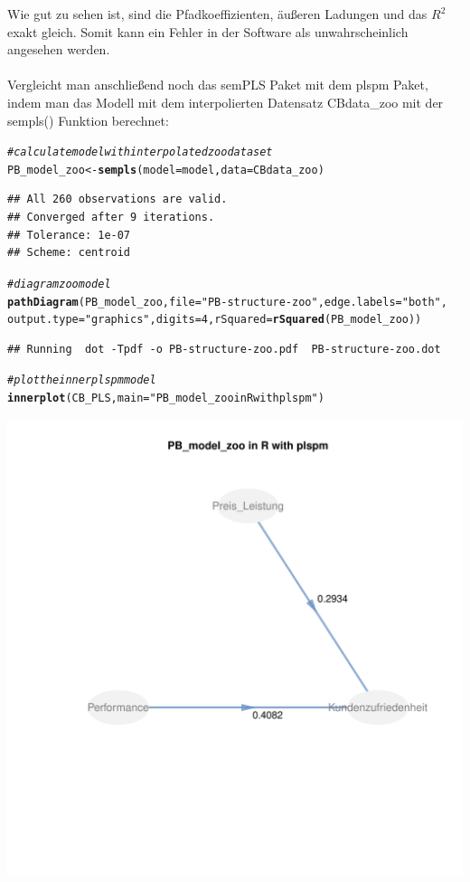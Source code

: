 \documentclass{article}\usepackage[]{graphicx}\usepackage[]{color}
\makeatletter
\def\maxwidth{ %
  \ifdim\Gin@nat@width>\linewidth
    \linewidth
  \else
    \Gin@nat@width
  \fi
}
\newcommand{\hlnum}[1]{\textcolor[rgb]{0.686,0.059,0.569}{#1}}%
\newcommand{\hlstr}[1]{\textcolor[rgb]{0.192,0.494,0.8}{#1}}%
\newcommand{\hlcom}[1]{\textcolor[rgb]{0.678,0.584,0.686}{\textit{#1}}}%
\newcommand{\hlstd}[1]{\textcolor[rgb]{0.345,0.345,0.345}{#1}}%
\newcommand{\hlkwb}[1]{\textcolor[rgb]{0.69,0.353,0.396}{#1}}%
\newcommand{\hlkwc}[1]{\textcolor[rgb]{0.333,0.667,0.333}{#1}}%
\newcommand{\hlkwd}[1]{\textcolor[rgb]{0.737,0.353,0.396}{\textbf{#1}}}%
\newenvironment{kframe}{%
 \def\at@end@of@kframe{}%
 \ifinner\ifhmode%
  \def\at@end@of@kframe{\end{minipage}}%
  \begin{minipage}{\columnwidth}%
 \fi\fi%
 \def\FrameCommand##1{\hskip\@totalleftmargin \hskip-\fboxsep
 \colorbox{shadecolor}{##1}\hskip-\fboxsep
     \hskip-\linewidth \hskip-\@totalleftmargin \hskip\columnwidth}%
 \MakeFramed {\advance\hsize-\width
   \@totalleftmargin\z@ \linewidth\hsize
   \@setminipage}}%
 {\par\unskip\endMakeFramed%
 \at@end@of@kframe}
\newenvironment{knitrout}{}{} %
\makeatother
\begin{document}
Wie gut zu sehen ist, sind die Pfadkoeffizienten, äußeren Ladungen und das $R^{2}$ exakt gleich. Somit kann ein Fehler in der Software als unwahrscheinlich angesehen werden.\\
\\
Vergleicht man anschließend noch das semPLS Paket mit dem plspm Paket, indem man das Modell mit dem interpolierten Datensatz CBdata\_zoo mit der sempls() Funktion berechnet:
\begin{knitrout}
\color{fgcolor}\begin{kframe}
\begin{alltt}
\hlcom{#calculate model with interpolated zoo dataset}
\hlstd{PB_model_zoo} \hlkwb{<-} \hlkwd{sempls}\hlstd{(}\hlkwc{model} \hlstd{= model,}\hlkwc{data} \hlstd{= CBdata_zoo)}
\end{alltt}
\begin{verbatim}
## All 260 observations are valid.
## Converged after 9 iterations.
## Tolerance: 1e-07
## Scheme: centroid
\end{verbatim}
\begin{alltt}
\hlcom{#diagram zoo model}
\hlkwd{pathDiagram}\hlstd{(PB_model_zoo,} \hlkwc{file} \hlstd{=} \hlstr{"PB-structure-zoo"}\hlstd{,} \hlkwc{edge.labels} \hlstd{=} \hlstr{"both"}\hlstd{,}
           \hlkwc{output.type} \hlstd{=} \hlstr{"graphics"}\hlstd{,} \hlkwc{digits} \hlstd{=} \hlnum{4}\hlstd{,} \hlkwc{rSquared}\hlstd{=}\hlkwd{rSquared}\hlstd{(PB_model_zoo))}
\end{alltt}
\begin{verbatim}
## Running  dot -Tpdf -o PB-structure-zoo.pdf  PB-structure-zoo.dot
\end{verbatim}
\begin{alltt}
\hlcom{#plot the inner plspm model}
\hlkwd{innerplot}\hlstd{(CB_PLS,} \hlkwc{main} \hlstd{=}\hlstr{"PB_model_zoo in R with plspm"}\hlstd{)}
\end{alltt}
\end{kframe}
\includegraphics[width=\maxwidth]{figure/unnamed-chunk-11} 

\end{knitrout}
\end{document}
